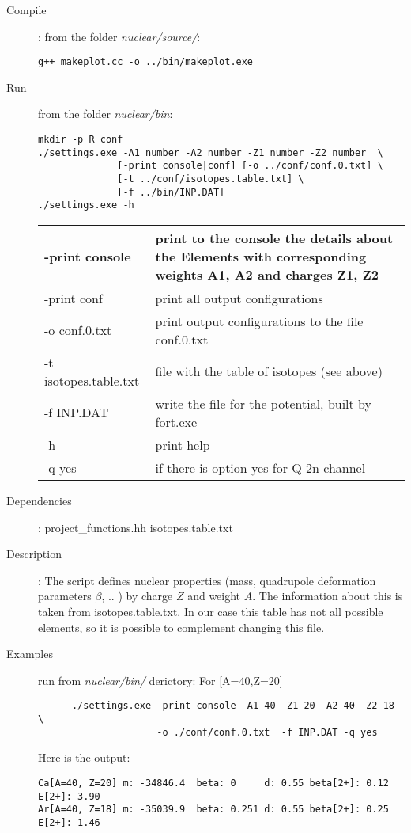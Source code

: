 \documentclass[preprint,review,12pt]{elsarticle}
\begin{document}
    \begin{description}
       \item[Compile]:  from the folder \textit{nuclear/source/}:  
        \begin{verbatim}
g++ makeplot.cc -o ../bin/makeplot.exe

        \end{verbatim}
       \item[Run] from the folder \textit{nuclear/bin}:
        \begin{verbatim}
mkdir -p R conf 
./settings.exe -A1 number -A2 number -Z1 number -Z2 number  \
              [-print console|conf] [-o ../conf/conf.0.txt] \
              [-t ../conf/isotopes.table.txt] \
              [-f ../bin/INP.DAT]
./settings.exe -h
        \end{verbatim}
          \begin{center}
              \begin{tabular}{ | l | p{10cm} |}
              \hline
              -print console   & print to the console the details about the Elements with corresponding weights A1, A2 and charges  Z1, Z2 \\ \hline
              -print conf      & print all output configurations   \\ \hline
              -o conf.0.txt    & print output configurations to the file conf.0.txt \\ \hline
              -t isotopes.table.txt  & file with the table of isotopes (see above) \\ \hline
              -f INP.DAT       & write the file for the potential, built by fort.exe  \\ \hline
              -h               & print help  \\ \hline
              -q yes           & if there is option yes for Q 2n channel  \\ \hline
              \end{tabular}
          \end{center}   
       \item [Dependencies]:
           \subitem   project\_functions.hh
           \subitem   isotopes.table.txt 
       \item [Description]: The script defines nuclear properties (mass, quadrupole deformation parameters $\beta$, .. ) by charge $Z$ and weight $A$. The information about this is taken from isotopes.table.txt. In our case this table has not all possible elements, so it is possible to complement changing this file.
       \item [Examples] run from \textit{nuclear/bin/} derictory:
        \subitem For [A=40,Z=20]
    \begin{verbatim}
      ./settings.exe -print console -A1 40 -Z1 20 -A2 40 -Z2 18 \
                     -o ./conf/conf.0.txt  -f INP.DAT -q yes
    \end{verbatim}  
Here is the output:     
    \begin{verbatim}
Ca[A=40, Z=20] m: -34846.4  beta: 0     d: 0.55 beta[2+]: 0.12 E[2+]: 3.90
Ar[A=40, Z=18] m: -35039.9  beta: 0.251 d: 0.55 beta[2+]: 0.25 E[2+]: 1.46
   

\end{verbatim}
\end{description}
\end{document}
